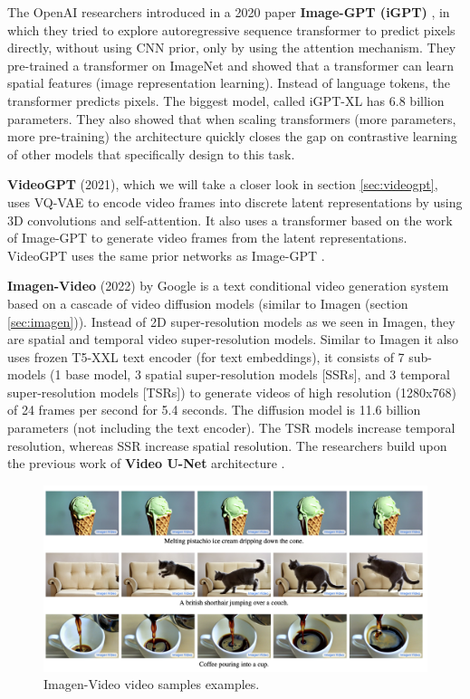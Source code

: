 The OpenAI researchers introduced in a 2020 paper \textbf{Image-GPT (iGPT)} \cite{imagegpt}, in which they tried to explore autoregressive sequence transformer to predict pixels directly, without using CNN prior, only by using the attention mechanism. They pre-trained a transformer on ImageNet and showed that a transformer can learn spatial features (image representation learning). Instead of language tokens, the transformer predicts pixels. The biggest model, called iGPT-XL has 6.8 billion parameters. They also showed that when scaling transformers (more parameters, more pre-training) the architecture quickly closes the gap on contrastive learning of other models that specifically design to this task.

\textbf{VideoGPT} \cite{videogpt} (2021), which we will take a closer look in section \ref{sec:videogpt}, uses VQ-VAE to encode video frames into discrete latent representations by using 3D convolutions and self-attention. It also uses a transformer based on the work of Image-GPT to generate video frames from the latent representations. VideoGPT uses the same prior networks as Image-GPT \cite{imagegpt}.

\textbf{Imagen-Video} \cite{imagen_video} (2022) by Google is a text conditional video generation system based on a cascade of video diffusion models (similar to Imagen (section \ref{sec:imagen})). Instead of 2D super-resolution models as we seen in Imagen, they are spatial and temporal video super-resolution models. Similar to Imagen it also uses frozen T5-XXL \cite{t5_model} text encoder (for text embeddings), it consists of 7 sub-models (1 base model, 3 spatial super-resolution models [SSRs], and 3 temporal super-resolution models [TSRs]) to generate videos of high resolution (1280x768) of 24 frames per second for 5.4 seconds. The diffusion model is 11.6 billion parameters (not including the text encoder). The TSR models increase temporal resolution, whereas SSR increase spatial resolution. The researchers build upon the previous work of \textbf{Video U-Net} architecture \cite{video_diffusion_models}.

\begin{figure}
    \centering
    \includegraphics[width=1\textwidth]{images/video_synthesis/imagen_video.png}
    \caption{Imagen-Video video samples examples.}
\end{figure}

